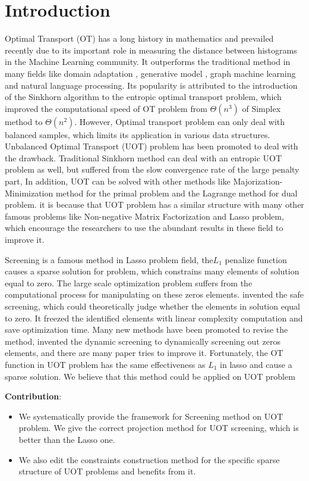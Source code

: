 \section{Introduction}
Optimal Transport (OT) has a long history in mathematics and prevailed recently due to its important role in measuring the distance between histograms in the Machine Learning community. It outperforms the traditional method in many fields like domain adaptation \citep{7586038}, generative model \citep{arjovsky2017wasserstein}, graph machine learning \citep{NEURIPS2019_fdd5b16f} and natural language processing. \citep{084adf2f555549c493e0331a00e4ecad} Its popularity is attributed to the introduction of the Sinkhorn algorithm to the entropic optimal transport problem, \citep{NIPS2013_af21d0c9} which improved the computational speed of OT problem from $\Theta (n^3)$ of Simplex method to $\Theta (n^2)$. However, Optimal transport problem can only deal with balanced samples, which limits its application in various data structures. Unbalanced Optimal Transport (UOT) problem has been promoted to deal with the drawback. Traditional Sinkhorn method can deal with an entropic UOT problem as well, but suffered from the slow convergence rate of the large penalty part, In addition, UOT can be solved with other methods like Majorization-Minimization method for the primal problem and the Lagrange method for dual problem\citep{NEURIPS2021_c3c617a9}. it is because that UOT problem has a similar structure with many other famous problems like Non-negative Matrix Factorization and Lasso problem, which encourage the researchers to use the abundant results in these field to improve it.

Screening is a famous method in Lasso problem field, the$L_1$ penalize function causes a sparse solution for problem, which constrains many elements of solution equal to zero. The large scale optimization problem suffers from the computational process for manipulating on these zeros elements. \citep{ghaoui2010safe} invented the safe screening, which could theoretically judge whether the elements in solution equal to zero. It freezed the identified elements with linear complexity computation and save optimization time. Many new methods have been promoted to revise the method, \citep{JMLR:v18:16-577} invented the dynamic screening to dynamically screening out zeros elements, and there are many paper tries to improve it.  
Fortunately, the OT function in UOT problem has the same effectiveness as $L_1$ in lasso and cause a sparse solution. We believe that this method could be applied on UOT problem

\textbf{Contribution}: 
\begin{itemize}
\item We systematically provide the framework for Screening method on UOT problem. We give the correct projection method for UOT screening, which is better than the Lasso one. 
\item We also edit the constraints construction method for the specific sparse structure of UOT problems and benefits from it.
\end{itemize}



